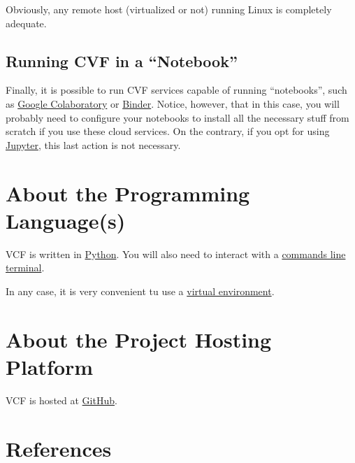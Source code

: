 Obviously, any remote host (virtualized or not) running Linux is
completely adequate.

\subsection{Running CVF in a ``Notebook''}
Finally, it is possible to run CVF services capable of running
``notebooks'', such as
\href{https://colab.research.google.com/}{Google Colaboratory} or
\href{https://mybinder.org/}{Binder}. Notice, however, that in this
case, you will probably need to configure your notebooks to install all the necessary stuff from scratch if you use these
cloud services. On the contrary, if you opt for using
\href{https://jupyter.org/}{Jupyter}, this last action is not
necessary.

\section{About the Programming Language(s)}

VCF is written in \href{https://www.python.org/}{Python}. You will also need to interact with
a \href{https://en.wikipedia.org/wiki/Command-line_interface}{commands
  line terminal}.

In any case, it is very convenient tu use a
\href{https://docs.python.org/3/library/venv.html}{virtual
  environment}.

\section{About the Project Hosting Platform}

VCF is hosted at \href{https://github.com}{GitHub}.

\section{References}

\renewcommand{\addcontentsline}[3]{}%

